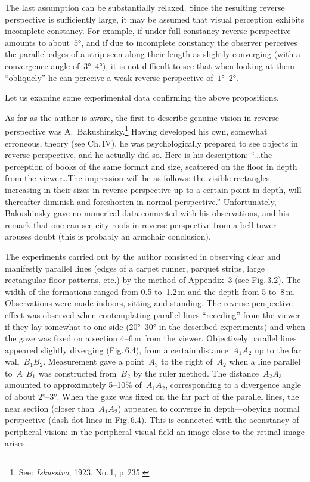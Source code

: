 The last assumption can be substantially relaxed.  Since the resulting reverse perspective
is sufficiently large, it may be assumed that visual perception exhibits incomplete
constancy.  For example, if under full constancy reverse perspective amounts to about~$5°$,
and if due to incomplete constancy the observer perceives the parallel edges of a strip
seen along their length as slightly converging (with a convergence angle of~$3°$--$4°$),
it is not difficult to see that when looking at them ``obliquely'' he can perceive a weak
reverse perspective of~$1°$--$2°$.


Let us examine some experimental data confirming the above propositions.

As far as the author is aware, the first to describe genuine vision in reverse perspective
was A.~Bakushinsky.\footnote{See: \emph{Iskusstvo}, 1923, No.\,1, p.\,235.}  Having
developed his own, somewhat erroneous, theory (see Ch.\,IV), he was psychologically
prepared to see objects in reverse perspective, and he actually did so.  Here is his
description: ``\ldots the perception of books of the same format and size, scattered on
the floor in depth from the viewer\ldots The impression will be as follows: the visible
rectangles, increasing in their sizes in reverse perspective up to a certain point in
depth, will thereafter diminish and foreshorten in normal perspective.''  Unfortunately,
Bakushinsky gave no numerical data connected with his observations, and his remark that
one can see city roofs in reverse perspective from a bell-tower arouses doubt (this is
probably an armchair conclusion).

The experiments carried out by the author consisted in observing clear and manifestly
parallel lines (edges of a carpet runner, parquet strips, large rectangular floor
patterns, etc.) by the method of Appendix~3 (see Fig.\,3.2).  The width of the
formations ranged from 0.5 to~1.2\,m and the depth from 5 to~8\,m.  Observations were
made indoors, sitting and standing.  The reverse-perspective effect was observed when
contemplating parallel lines ``receding'' from the viewer if they lay somewhat to one
side ($20°$--$30°$ in the described experiments) and when the gaze was fixed on a
section 4--6\,m from the viewer.  Objectively parallel lines appeared slightly diverging
(Fig.\,6.4), from a certain distance~$A_1A_2$ up to the far wall~$B_1B_2$.  Measurement
gave a point~$A_3$ to the right of~$A_2$ when a line parallel to~$A_1B_1$ was
constructed from~$B_2$ by the ruler method.  The distance~$A_2A_3$ amounted to
approximately 5--10\% of~$A_1A_2$, corresponding to a divergence angle of about
$2°$--$3°$.  When the gaze was fixed on the far part of the parallel lines, the near
section (closer than~$A_1A_2$) appeared to converge in depth---obeying normal
perspective (dash-dot lines in Fig.\,6.4).  This is connected with the aconstancy of
peripheral vision: in the peripheral visual field an image close to the retinal image
arises.
